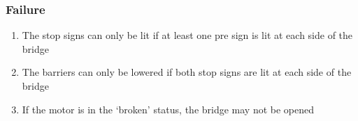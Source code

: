 \subsubsection*{Failure}
\begin{enumerate}
	\setcounter{enumi}{\theenumTemp}
	\item The stop signs can only be lit if at least one pre sign is lit at
	      each side of the bridge
	\item The barriers can only be lowered if both stop signs are lit at each
	      side of the bridge
	\item If the motor is in the `broken' status, the bridge may not be opened
	\setcounter{enumTemp}{\theenumi}
\end{enumerate}
%

\newpage